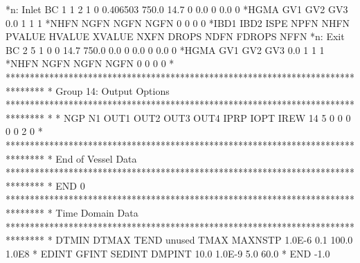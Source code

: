 *n: Inlet BC
    1    1    2    1    0  0.406503     750.0      14.7    0       0.0    0       0.0    0
*HGMA  GV1  GV2  GV3
  0.0    1    1    1
*NHFN NGFN NGFN NGFN
    0    0    0    0
*IBD1 IBD2 ISPE NPFN NHFN    PVALUE    HVALUE    XVALUE NXFN     DROPS NDFN    FDROPS NFFN
*n: Exit BC
    2    5    1    0    0      14.7     750.0       0.0    0       0.0    0       0.0    0
*HGMA  GV1  GV2  GV3
  0.0    1    1    1
*NHFN NGFN NGFN NGFN
    0    0    0    0
*
********************************************************************************
* Group 14: Output Options
********************************************************************************
*
* NGP   N1 OUT1 OUT2 OUT3 OUT4 IPRP IOPT IREW
   14    5    0    0    0    0    0    2    0
*
********************************************************************************
* End of Vessel Data
********************************************************************************
*  END
     0
********************************************************************************
* Time Domain Data
********************************************************************************
*        DTMIN         DTMAX          TEND        unused          TMAX   MAXNSTP
        1.0E-6           0.1         100.0                       1.0E8
*        EDINT         GFINT        SEDINT        DMPINT
          10.0        1.0E-9           5.0          60.0
*          END
          -1.0